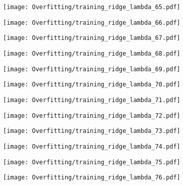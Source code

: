 \documentclass[xcolor=pdftex,dvipsnames,table]{beamer}
\begin{document}
\frame
{
	\begin{center}
		\texttt{[image: Overfitting/training\_ridge\_lambda\_65.pdf]}
	\end{center}
}

\frame
{
	\begin{center}
		\texttt{[image: Overfitting/training\_ridge\_lambda\_66.pdf]}
	\end{center}
}

\frame
{
	\begin{center}
		\texttt{[image: Overfitting/training\_ridge\_lambda\_67.pdf]}
	\end{center}
}

\frame
{
	\begin{center}
		\texttt{[image: Overfitting/training\_ridge\_lambda\_68.pdf]}
	\end{center}
}

\frame
{
	\begin{center}
		\texttt{[image: Overfitting/training\_ridge\_lambda\_69.pdf]}
	\end{center}
}

\frame
{
	\begin{center}
		\texttt{[image: Overfitting/training\_ridge\_lambda\_70.pdf]}
	\end{center}
}

\frame
{
	\begin{center}
		\texttt{[image: Overfitting/training\_ridge\_lambda\_71.pdf]}
	\end{center}
}

\frame
{
	\begin{center}
		\texttt{[image: Overfitting/training\_ridge\_lambda\_72.pdf]}
	\end{center}
}

\frame
{
	\begin{center}
		\texttt{[image: Overfitting/training\_ridge\_lambda\_73.pdf]}
	\end{center}
}

\frame
{
	\begin{center}
		\texttt{[image: Overfitting/training\_ridge\_lambda\_74.pdf]}
	\end{center}
}

\frame
{
	\begin{center}
		\texttt{[image: Overfitting/training\_ridge\_lambda\_75.pdf]}
	\end{center}
}

\frame
{
	\begin{center}
		\texttt{[image: Overfitting/training\_ridge\_lambda\_76.pdf]}
	\end{center}
}
\end{document}
